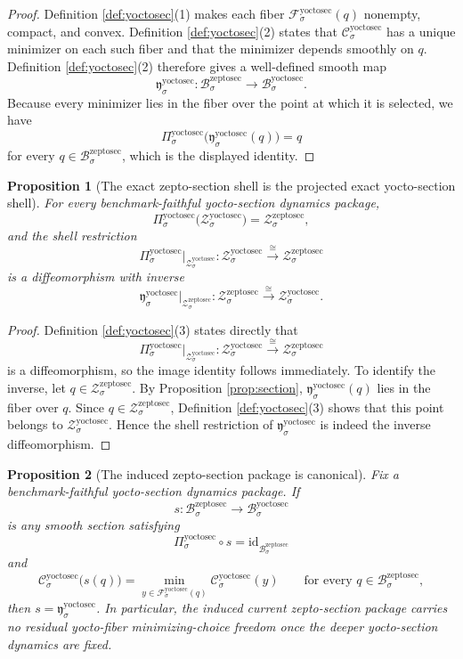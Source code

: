 \documentclass[11pt]{article}
\newcommand{\ZeptoSectionBody}[1]{\mathcal B_{#1}^{\mathrm{zeptosec}}}
\newcommand{\ZeptoSectionShell}[1]{\mathcal Z_{#1}^{\mathrm{zeptosec}}}
\newcommand{\YoctoSectionBody}[1]{\mathcal B_{#1}^{\mathrm{yoctosec}}}
\newcommand{\YoctoSectionProj}[1]{\Pi_{#1}^{\mathrm{yoctosec}}}
\newcommand{\YoctoSectionFiber}[2]{\mathcal F_{#1}^{\mathrm{yoctosec}}(#2)}
\newcommand{\YoctoSectionZeptoMin}[1]{\mathfrak y_{#1}^{\mathrm{yoctosec}}}
\newcommand{\YoctoSectionFunctional}[1]{\mathscr C_{#1}^{\mathrm{yoctosec}}}
\newcommand{\YoctoSectionShell}[1]{\mathcal Z_{#1}^{\mathrm{yoctosec}}}
\newtheorem{proposition}{Proposition}
\begin{document}
\begin{proof}
Definition \ref{def:yoctosec}(1) makes each fiber \(\YoctoSectionFiber{\sigma}{q}\) nonempty, compact, and convex. Definition \ref{def:yoctosec}(2) states that \(\YoctoSectionFunctional{\sigma}\) has a unique minimizer on each such fiber and that the minimizer depends smoothly on \(q\). Definition \ref{def:yoctosec}(2) therefore gives a well-defined smooth map
\[
\YoctoSectionZeptoMin{\sigma}:\ZeptoSectionBody{\sigma}\to\YoctoSectionBody{\sigma}.
\]
Because every minimizer lies in the fiber over the point at which it is selected, we have
\[
\YoctoSectionProj{\sigma}\bigl(\YoctoSectionZeptoMin{\sigma}(q)\bigr)=q
\]
for every \(q\in\ZeptoSectionBody{\sigma}\), which is the displayed identity.
\end{proof}

\begin{proposition}[The exact zepto-section shell is the projected exact yocto-section shell]
\label{prop:shell}
For every benchmark-faithful yocto-section dynamics package,
\[
\YoctoSectionProj{\sigma}\bigl(\YoctoSectionShell{\sigma}\bigr)
=
\ZeptoSectionShell{\sigma},
\]
and the shell restriction
\[
\YoctoSectionProj{\sigma}\big|_{\YoctoSectionShell{\sigma}}
:
\YoctoSectionShell{\sigma}\xrightarrow{\cong}\ZeptoSectionShell{\sigma}
\]
is a diffeomorphism with inverse
\[
\YoctoSectionZeptoMin{\sigma}\big|_{\ZeptoSectionShell{\sigma}}
:
\ZeptoSectionShell{\sigma}\xrightarrow{\cong}\YoctoSectionShell{\sigma}.
\]
\end{proposition}

\begin{proof}
Definition \ref{def:yoctosec}(3) states directly that
\[
\YoctoSectionProj{\sigma}\big|_{\YoctoSectionShell{\sigma}}
:
\YoctoSectionShell{\sigma}\xrightarrow{\cong}\ZeptoSectionShell{\sigma}
\]
is a diffeomorphism, so the image identity follows immediately. To identify the inverse, let \(q\in\ZeptoSectionShell{\sigma}\). By Proposition \ref{prop:section}, \(\YoctoSectionZeptoMin{\sigma}(q)\) lies in the fiber over \(q\). Since \(q\in\ZeptoSectionShell{\sigma}\), Definition \ref{def:yoctosec}(3) shows that this point belongs to \(\YoctoSectionShell{\sigma}\). Hence the shell restriction of \(\YoctoSectionZeptoMin{\sigma}\) is indeed the inverse diffeomorphism.
\end{proof}

\begin{proposition}[The induced zepto-section package is canonical]
\label{prop:canonical}
Fix a benchmark-faithful yocto-section dynamics package. If
\[
s:\ZeptoSectionBody{\sigma}\to\YoctoSectionBody{\sigma}
\]
is any smooth section satisfying
\[
\YoctoSectionProj{\sigma}\circ s
=
\mathrm{id}_{\ZeptoSectionBody{\sigma}}
\]
and
\[
\YoctoSectionFunctional{\sigma}\bigl(s(q)\bigr)
=
\min_{y\in\YoctoSectionFiber{\sigma}{q}}
\YoctoSectionFunctional{\sigma}(y)
\qquad
\text{for every }
q\in\ZeptoSectionBody{\sigma},
\]
then \(s=\YoctoSectionZeptoMin{\sigma}\). In particular, the induced current zepto-section package carries no residual yocto-fiber minimizing-choice freedom once the deeper yocto-section dynamics are fixed.
\end{proposition}
\end{document}
